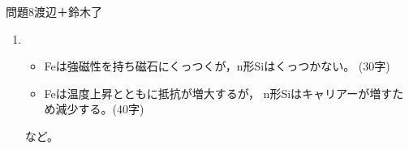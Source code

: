 \documentclass[fleqn]{jbook}
\begin{document}
\begin{answer}{問題8}{渡辺＋鈴木了}
\begin{enumerate}
\begin{enumerate}
\end{enumerate}

  \item 　
\begin{itemize}
    \item Feは強磁性を持ち磁石にくっつくが，n形Siはくっつかない。
    (30字)
    \item Feは温度上昇とともに抵抗が増大するが，
    n形Siはキャリアーが増すため減少する。(40字)
\end{itemize}
など。\\
  
\end{enumerate}

\end{answer}
\end{document}
